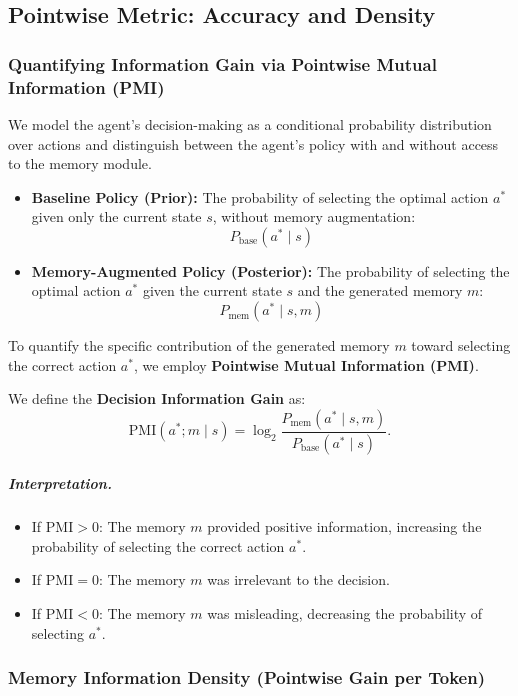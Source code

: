 \subsection{Pointwise Metric: Accuracy and Density}

\subsubsection{Quantifying Information Gain via Pointwise Mutual Information (PMI)}

We model the agent's decision-making as a conditional probability distribution over actions and distinguish between the agent's policy with and without access to the memory module.
\begin{itemize}
    \item \textbf{Baseline Policy (Prior):} The probability of selecting the optimal action $a^*$ given only the current state $s$, without memory augmentation:
    \[
    P_{\text{base}}(a^* \mid s)
    \]
    \item \textbf{Memory-Augmented Policy (Posterior):} The probability of selecting the optimal action $a^*$ given the current state $s$ and the generated memory $m$:
    \[
    P_{\text{mem}}(a^* \mid s, m)
    \]
\end{itemize}

To quantify the specific contribution of the generated memory $m$ toward selecting the correct action $a^*$, we employ \textbf{Pointwise Mutual Information (PMI)}.

We define the \textbf{Decision Information Gain} as:
\[
\mathrm{PMI}(a^*; m \mid s)
    = \log_{2} \frac{P_{\text{mem}}(a^* \mid s, m)}{P_{\text{base}}(a^* \mid s)} .
\]

\subparagraph{Interpretation.}
\begin{itemize}
    \item If $\mathrm{PMI} > 0$: The memory $m$ provided positive information, increasing the probability of selecting the correct action $a^*$.
    \item If $\mathrm{PMI} = 0$: The memory $m$ was irrelevant to the decision.
    \item If $\mathrm{PMI} < 0$: The memory $m$ was misleading, decreasing the probability of selecting $a^*$.
\end{itemize}

\subsubsection{Memory Information Density (Pointwise Gain per Token)}


